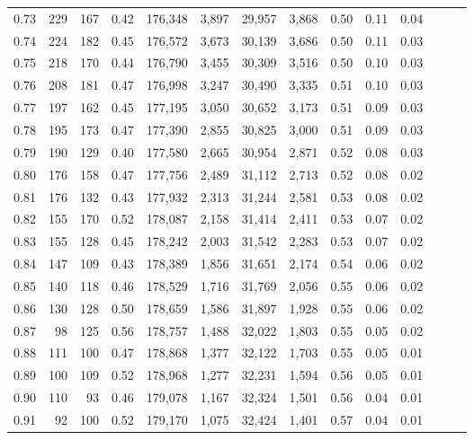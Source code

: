 \begin{tabular}{rrrrrrrrrrrrrr}
0.73 &    229 &  167 &  0.42 &  176,348 &    3,897 &  29,957 &   3,868 &  0.50 &  0.11 &      0.04 \\
0.74 &    224 &  182 &  0.45 &  176,572 &    3,673 &  30,139 &   3,686 &  0.50 &  0.11 &      0.03 \\
0.75 &    218 &  170 &  0.44 &  176,790 &    3,455 &  30,309 &   3,516 &  0.50 &  0.10 &      0.03 \\
0.76 &    208 &  181 &  0.47 &  176,998 &    3,247 &  30,490 &   3,335 &  0.51 &  0.10 &      0.03 \\
0.77 &    197 &  162 &  0.45 &  177,195 &    3,050 &  30,652 &   3,173 &  0.51 &  0.09 &      0.03 \\
0.78 &    195 &  173 &  0.47 &  177,390 &    2,855 &  30,825 &   3,000 &  0.51 &  0.09 &      0.03 \\
0.79 &    190 &  129 &  0.40 &  177,580 &    2,665 &  30,954 &   2,871 &  0.52 &  0.08 &      0.03 \\
0.80 &    176 &  158 &  0.47 &  177,756 &    2,489 &  31,112 &   2,713 &  0.52 &  0.08 &      0.02 \\
0.81 &    176 &  132 &  0.43 &  177,932 &    2,313 &  31,244 &   2,581 &  0.53 &  0.08 &      0.02 \\
0.82 &    155 &  170 &  0.52 &  178,087 &    2,158 &  31,414 &   2,411 &  0.53 &  0.07 &      0.02 \\
0.83 &    155 &  128 &  0.45 &  178,242 &    2,003 &  31,542 &   2,283 &  0.53 &  0.07 &      0.02 \\
0.84 &    147 &  109 &  0.43 &  178,389 &    1,856 &  31,651 &   2,174 &  0.54 &  0.06 &      0.02 \\
0.85 &    140 &  118 &  0.46 &  178,529 &    1,716 &  31,769 &   2,056 &  0.55 &  0.06 &      0.02 \\
0.86 &    130 &  128 &  0.50 &  178,659 &    1,586 &  31,897 &   1,928 &  0.55 &  0.06 &      0.02 \\
0.87 &     98 &  125 &  0.56 &  178,757 &    1,488 &  32,022 &   1,803 &  0.55 &  0.05 &      0.02 \\
0.88 &    111 &  100 &  0.47 &  178,868 &    1,377 &  32,122 &   1,703 &  0.55 &  0.05 &      0.01 \\
0.89 &    100 &  109 &  0.52 &  178,968 &    1,277 &  32,231 &   1,594 &  0.56 &  0.05 &      0.01 \\
0.90 &    110 &   93 &  0.46 &  179,078 &    1,167 &  32,324 &   1,501 &  0.56 &  0.04 &      0.01 \\
0.91 &     92 &  100 &  0.52 &  179,170 &    1,075 &  32,424 &   1,401 &  0.57 &  0.04 &      0.01 \\

\end{tabular}
